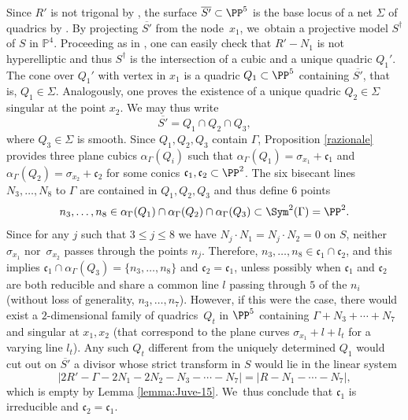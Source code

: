 Since $R'$ is not trigonal by \cite[Prop.\,5.6]{DL}, the surface $\overline{S'}\subset \PP^5$ is the base locus of a net $\Sigma$ of quadrics by \cite[Ex.\,VIII.22(11)]{Be}. By projecting $\overline{S'}$ from the node~$x_1$, we~obtain a projective model $S^\dagger$ of $S$ in $\mathbb P^4$. Proceeding as in \cite[Prop.\,5.6]{DL}, one can easily check that $R'-N_1$ is not hyperelliptic and thus $S^\dagger$ is the intersection of a cubic and a unique quadric $Q_1'$. The cone over $Q_1'$ with vertex in $x_1$ is a quadric $Q_1\subset \PP^5$ containing $\overline{S'}$, that is, $Q_1\in \Sigma$. Analogously, one proves the existence of a unique quadric $Q_2\in \Sigma$ singular at the point $x_2$.
We may thus write
\[
\overline{S'}=Q_1\cap Q_2\cap Q_3,
\]
where $Q_3\in \Sigma$ is smooth. Since $Q_1,Q_2,Q_3$ contain $\Gamma$, Proposition \ref{razionale} provides three plane cubics $\alpha_\Gamma(Q_i)$ such that $\alpha_\Gamma(Q_1)=\sigma_{x_1}+\mathfrak{c}_1$ and $\alpha_\Gamma(Q_2)=\sigma_{x_2}+\mathfrak{c}_2$ for some conics $\mathfrak{c}_1,\mathfrak{c}_2\subset \PP^2$. The six bisecant lines $N_3,\ldots,N_8$ to $\Gamma$ are contained in $Q_1,Q_2,Q_3$ and thus define $6$ points
\[
n_3,\ldots,n_8\in\alpha_\Gamma(Q_1)\cap \alpha_\Gamma(Q_2)\cap\alpha_\Gamma(Q_3)\subset\Sym^2(\Gamma)=\PP^2.
\]
Since for any $j$ such that $3\leq j\leq 8$ we have $N_j\cdot N_1=N_j\cdot N_2=0$ on $S$, neither~$\sigma_{x_1}$ nor~$\sigma_{x_2}$ passes through the points $n_j$. Therefore, $n_3,\ldots,n_8\in \mathfrak{c}_1\cap \mathfrak{c}_2$, and this implies $\mathfrak{c}_1\cap \alpha_{\Gamma}(Q_3)=\{ n_3,\ldots,n_8 \}$ and $\mathfrak{c}_2=\mathfrak{c}_1$, unless possibly when $\mathfrak{c}_1$ and $\mathfrak{c}_2$ are both reducible and share a common line $l$ passing through $5$ of the $n_i$ (without loss of generality, $n_3,\ldots,n_7$). However, if this were the case, there would exist a $2$-dimensional family of quadrics~$Q_t$ in $\PP^5$ containing $\Gamma+N_3+\cdots+N_7$ and singular at $x_1, x_2$ (that correspond to the plane curves $\sigma_{x_1}+l+l_t$ for a varying line $l_t$). Any such $Q_t$ different from the uniquely determined $Q_1$ would cut out on $\overline{S'}$ a divisor whose strict transform in $S$ would lie in the linear system
\begin{equation*}
|2R'-\Gamma- 2N_1-2N_2-N_3-\cdots-N_7|=|R-N_1-\cdots-N_7|,
\end{equation*}
which is empty by Lemma \ref{lemma:Juve-15}. We~thus conclude that $\mathfrak{c}_1$ is irreducible and $\mathfrak{c}_2=\mathfrak{c}_1$.

